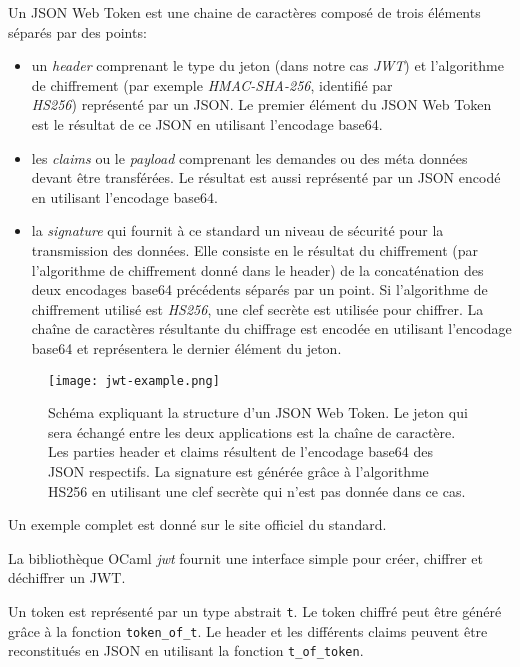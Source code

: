 Un JSON Web Token est une chaine de caractères composé de trois éléments séparés
par des points:
\begin{itemize}
  \item un \textit{header} comprenant le type du jeton (dans notre cas
    \emph{JWT}) et l'algorithme de chiffrement (par exemple
    \emph{HMAC-SHA-256}, identifié par \\ \emph{HS256})
    représenté par un JSON. Le premier élément du JSON Web Token est le
    résultat de ce JSON en utilisant l'encodage base64\cite{rfc-base64}.
  \item les \textit{claims} ou le \textit{payload} comprenant les demandes ou
    des méta données devant être transférées. Le résultat est aussi représenté
    par un JSON encodé en utilisant l'encodage base64.
  \item la \textit{signature} qui fournit à ce standard un niveau de sécurité
    pour la transmission des données. Elle consiste en le résultat du chiffrement
    (par l'algorithme de chiffrement donné dans le header) de la concaténation des
    deux encodages base64 précédents séparés par un point. Si l'algorithme de
    chiffrement utilisé est \emph{HS256}, une clef secrète est utilisée pour
    chiffrer. La chaîne de caractères résultante du chiffrage est encodée en
    utilisant l'encodage base64 et représentera le dernier élément du jeton.
\end{itemize}

\begin{figure}
  \centering
  \texttt{[image: jwt-example.png]}
  \caption{Schéma expliquant la structure d'un JSON Web Token. Le jeton qui sera
    échangé entre les deux applications est la chaîne de caractère. Les parties header
    et claims résultent de l'encodage base64 des JSON respectifs. La signature
    est générée grâce à l'algorithme HS256 en utilisant une clef secrète qui
    n'est pas donnée dans ce cas.}
\end{figure}

Un exemple complet est donné sur le site officiel du standard\cite{official-jwt-website}.

La bibliothèque OCaml \emph{jwt}\cite{ocaml-jwt-github} fournit une interface
simple pour créer, chiffrer et déchiffrer un JWT.

Un token est représenté par un type abstrait \verb|t|. Le token chiffré peut
être généré grâce à la fonction \verb|token_of_t|. Le header et les différents
claims peuvent être reconstitués en JSON en utilisant la fonction
\verb|t_of_token|.

